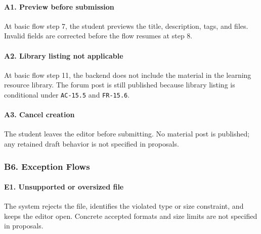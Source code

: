 \documentclass[12pt]{article}
\begin{document}
\paragraph*{A1. Preview before submission}
\par\medskip

At basic flow step 7, the student previews the title, description, tags, and files. Invalid fields are corrected before the flow resumes at step 8.
\par\medskip

\hypertarget{sec:a2-library-listing-not-applicable}{}
\paragraph*{A2. Library listing not applicable}
\par\medskip

At basic flow step 11, the backend does not include the material in the learning resource library. The forum post is still published because library listing is conditional under \texttt{AC-15.5} and \texttt{FR-15.6}.
\par\medskip

\hypertarget{sec:a3-cancel-creation}{}
\paragraph*{A3. Cancel creation}
\par\medskip

The student leaves the editor before submitting. No material post is published; any retained draft behavior is not specified in proposals.
\par\medskip

\hypertarget{sec:b6-exception-flows}{}
\subsubsection*{B6. Exception Flows}
\par\medskip

\hypertarget{sec:e1-unsupported-or-oversized-file}{}
\paragraph*{E1. Unsupported or oversized file}
\par\medskip

The system rejects the file, identifies the violated type or size constraint, and keeps the editor open. Concrete accepted formats and size limits are not specified in proposals.
\par\medskip
\end{document}
